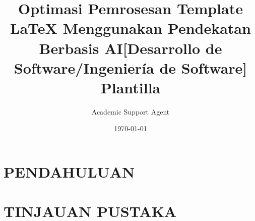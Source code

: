 \documentclass{article}
\title{Optimasi Pemrosesan Template LaTeX Menggunakan Pendekatan Berbasis AI}
\author{Academic Support Agent}
\date{\today}
\begin{document}
\maketitle

\begin{abstract}

\end{abstract}

\chapter{PENDAHULUAN}


\chapter{TINJAUAN PUSTAKA}


% 

\title{[Desarrollo de Software/Ingeniería de Software] Plantilla}
\end{document}
